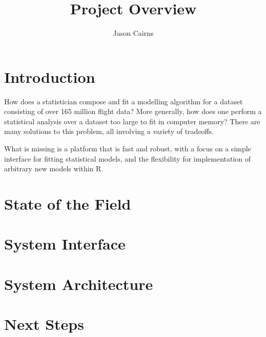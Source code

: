 \documentclass[a4paper,10pt]{article}
\begin{document}
\title{Project Overview}
\author{Jason Cairns}
  
\maketitle{}

\section{Introduction}
How does a statistician compose and fit a modelling algorithm for a dataset
consisting of over 165 million flight data?
More generally, how does one perform a statistical analysis over a dataset too
large to fit in computer memory?
There are many solutions to this problem, all involving a variety of tradeoffs.

What is missing is a platform that is fast and robust, with a focus on a simple
interface for fitting statistical models, and the flexibility for
implementation of arbitrary new models within R.
\section{State of the Field}
\section{System Interface}
\section{System Architecture}
\section{Next Steps}
\end{document}

